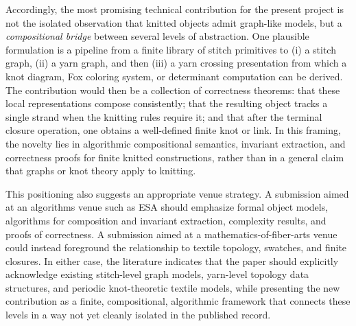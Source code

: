 \documentclass[11pt]{article}
\begin{document}
Accordingly, the most promising technical contribution for the present project is not the isolated observation that knitted objects admit graph-like models, but a \emph{compositional bridge} between several levels of abstraction. One plausible formulation is a pipeline from a finite library of stitch primitives to (i) a stitch graph, (ii) a yarn graph, and then (iii) a yarn crossing presentation from which a knot diagram, Fox coloring system, or determinant computation can be derived. The contribution would then be a collection of correctness theorems: that these local representations compose consistently; that the resulting object tracks a single strand when the knitting rules require it; and that after the terminal closure operation, one obtains a well-defined finite knot or link. In this framing, the novelty lies in algorithmic compositional semantics, invariant extraction, and correctness proofs for finite knitted constructions, rather than in a general claim that graphs or knot theory apply to knitting.

This positioning also suggests an appropriate venue strategy. A submission aimed at an algorithms venue such as ESA should emphasize formal object models, algorithms for composition and invariant extraction, complexity results, and proofs of correctness. A submission aimed at a mathematics-of-fiber-arts venue could instead foreground the relationship to textile topology, swatches, and finite closures. In either case, the literature indicates that the paper should explicitly acknowledge existing stitch-level graph models, yarn-level topology data structures, and periodic knot-theoretic textile models, while presenting the new contribution as a finite, compositional, algorithmic framework that connects these levels in a way not yet cleanly isolated in the published record.



\end{document}
